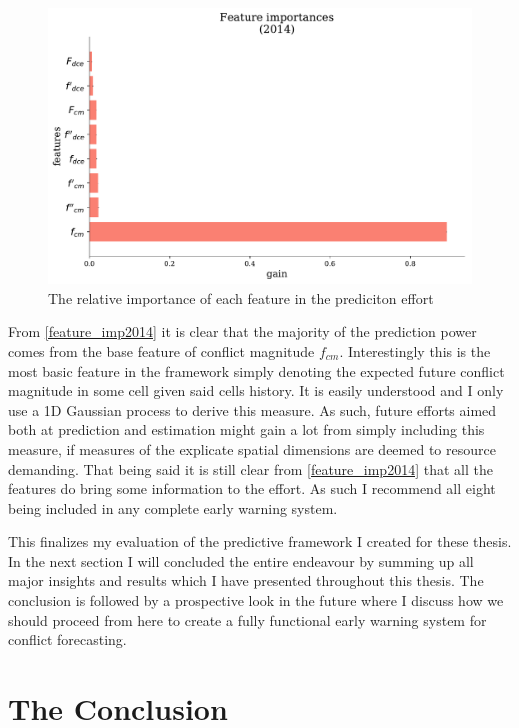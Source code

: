 \documentclass[a4paper]{article}
\begin{document}
\begin{figure}[!htb]
 	\centering
	\includegraphics[scale=0.47]{feature_imp_2014.pdf}
  \caption{\footnotesize{The relative importance of each feature in the prediciton effort}}\label{feature_imp2014}
\end{figure}

From \autoref{feature_imp2014} it is clear that the majority of the prediction power comes from the base feature of conflict magnitude $f_{cm}$. Interestingly this is the most basic feature in the framework simply denoting the expected future conflict magnitude in some cell given said cells history. It is easily understood and I only use a 1D Gaussian process to derive this measure. As such, future efforts aimed both at prediction and estimation might gain a lot from simply including this measure, if measures of the explicate spatial dimensions are deemed to resource demanding. That being said it is still clear from \autoref{feature_imp2014} that all the features do bring some information to the effort. As such I recommend all eight being included in any complete early warning system.\par

This finalizes my evaluation of the predictive framework I created for these thesis. In the next section I will concluded the entire endeavour by summing up all major insights and results which I have presented throughout this thesis. The conclusion is followed by a prospective look in the future where I discuss how we should proceed from here to create a fully functional early warning system for conflict forecasting.\par

\section{The Conclusion}
\end{document}
